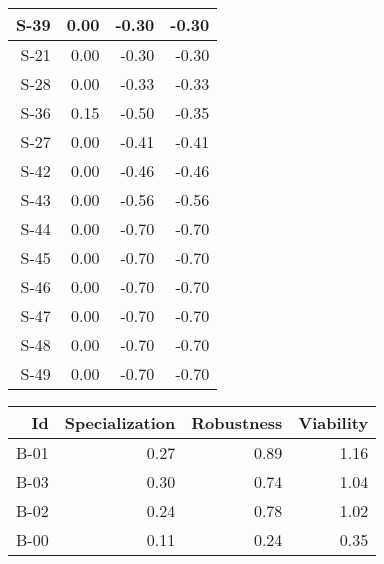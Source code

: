 \begin{tabular}{ | r | r | r | r | }
    \hline
                  S-39  &            0.00  &           -0.30  &           -0.30  \\
    \hline
                  S-21  &            0.00  &           -0.30  &           -0.30  \\
    \hline
                  S-28  &            0.00  &           -0.33  &           -0.33  \\
    \hline
                  S-36  &            0.15  &           -0.50  &           -0.35  \\
    \hline
                  S-27  &            0.00  &           -0.41  &           -0.41  \\
    \hline
                  S-42  &            0.00  &           -0.46  &           -0.46  \\
    \hline
                  S-43  &            0.00  &           -0.56  &           -0.56  \\
    \hline
                  S-44  &            0.00  &           -0.70  &           -0.70  \\
    \hline
                  S-45  &            0.00  &           -0.70  &           -0.70  \\
    \hline
                  S-46  &            0.00  &           -0.70  &           -0.70  \\
    \hline
                  S-47  &            0.00  &           -0.70  &           -0.70  \\
    \hline
                  S-48  &            0.00  &           -0.70  &           -0.70  \\
    \hline
                  S-49  &            0.00  &           -0.70  &           -0.70  \\
    \hline
\end{tabular}


\begin{tabular}{ | r | r | r | r | }
    \hline
                    Id  &  Specialization  &      Robustness  &       Viability  \\
    \hline
    \hline
                  B-01  &            0.27  &            0.89  &            1.16  \\
    \hline
                  B-03  &            0.30  &            0.74  &            1.04  \\
    \hline
                  B-02  &            0.24  &            0.78  &            1.02  \\
    \hline
                  B-00  &            0.11  &            0.24  &            0.35  \\
    \hline
\end{tabular}


